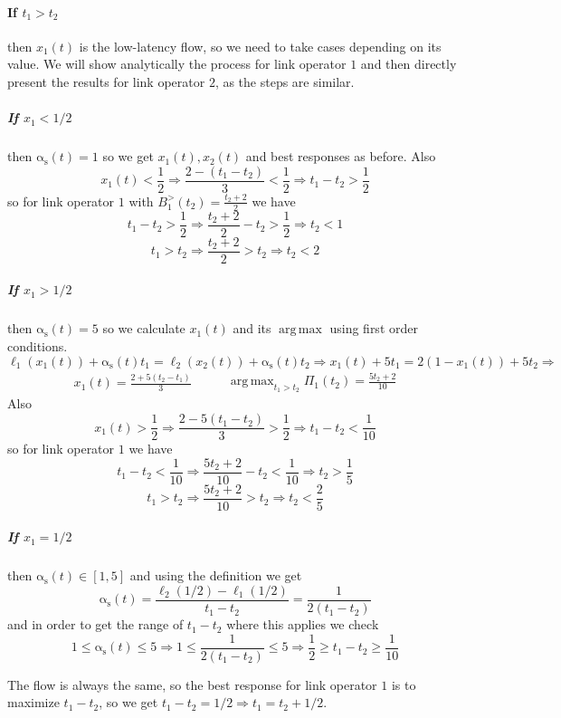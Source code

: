 \documentclass[10pt,a4paper]{book}
\newcommand{\as}{\mathrm{\alpha_s}}
\DeclareMathOperator*{\argmax}{arg\,max}
\theoremstyle{definition}
\theoremstyle{comment}
\begin{document}
\paragraph{If $t_1 > t_2$} then $x_1(t)$ is the low-latency flow, so we need to take cases depending on its value.
We will show analytically the process for link operator $1$ and then directly present the results for link operator $2$, as the steps are similar.

\subparagraph{If $x_1 < 1/2$} then $\as(t) = 1$ so we get $x_1(t), x_2(t)$ and best responses as before.
Also
\[x_1(t) < \frac12 \Rightarrow \frac{2 - (t_1 - t_2)}{3} < \frac12 \Rightarrow t_1 - t_2 > \frac12\]
so for link operator $1$ with $B_1^>(t_2) = \frac{t_2 + 2}2$ we have
\[t_1 - t_2 > \frac12 \Rightarrow \frac{t_2 + 2}2 - t_2 > \frac12 \Rightarrow t_2 < 1\]
\[t_1 > t_2 \Rightarrow \frac{t_2 + 2}2 > t_2 \Rightarrow t_2 < 2\]

\subparagraph{If $x_1 > 1/2$} then $\as(t) = 5$ so we calculate $x_1(t)$ and its $\argmax$ using first order conditions.
\[
	\ell_1(x_1(t)) + \as(t) t_1 = \ell_2(x_2(t)) + \as(t) t_2 \Rightarrow	x_1(t) + 5 t_1 = 2 (1 - x_1(t)) + 5 t_2 \Rightarrow
\]
\begin{equation*}
	\begin{aligned}
		x_1(t) = \frac{2 + 5 (t_2 - t_1)}3
	\end{aligned}
	\qquad
	\begin{aligned}
		\argmax_{t_1 > t_2}\Pi_1(t_2) = \frac{5 t_2 + 2}{10}
	\end{aligned}
\end{equation*}
Also
\[x_1(t) > \frac12 \Rightarrow \frac{2 - 5 (t_1 - t_2)}{3} > \frac12 \Rightarrow t_1 - t_2 < \frac1{10}\]
so for link operator $1$ we have
\[t_1 - t_2 < \frac1{10} \Rightarrow \frac{5 t_2 + 2}{10} - t_2 < \frac1{10} \Rightarrow t_2 > \frac15\]
\[t_1 > t_2 \Rightarrow \frac{5 t_2 + 2}{10} > t_2 \Rightarrow t_2 < \frac25\]

\subparagraph{If $x_1 = 1/2$} then $\as(t) \in [1, 5]$ and using the definition we get
\[\as(t) = \frac{\ell_2(1/2) - \ell_1(1/2)}{t_1 - t_2} = \frac1{2 (t_1 - t_2)}\]
and in order to get the range of $t_1 - t_2$ where this applies we check
\[1 \le \as(t) \le 5 \Rightarrow 1 \le \frac1{2 (t_1 - t_2)} \le 5 \Rightarrow \frac12 \ge t_1 - t_2 \ge \frac1{10}\]

The flow is always the same, so the best response for link operator $1$ is to maximize $t_1 - t_2$, so we get $t_1 - t_2 = 1/2 \Rightarrow t_1 = t_2 + 1/2$.
\end{document}
